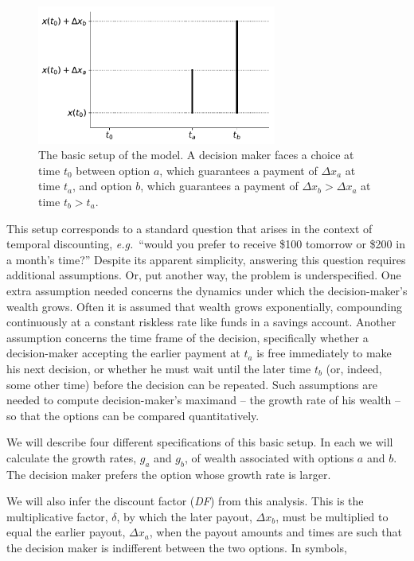 \documentclass[11pt]{article}
\newcommand{\eg}{{\it e.g.}\ }
\newcommand{\flabel}[1]{\label{fig:#1}}
\newcommand{\Dx}{\Delta x}
\numberwithin{equation}{section}
\begin{document}
\begin{figure}[!htb]
\centering
\includegraphics[width=0.7\textwidth]{./figures/setup.pdf}
\caption{
The basic setup of the model. A decision maker faces a choice at time $t_0$ between option $a$, which guarantees a payment of $\Dx_a$ at time $t_a$, and option $b$, which guarantees a payment of $\Dx_b>\Dx_a$ at time $t_b>t_a$.
}
\flabel{basicsetup}
\end{figure}

This setup corresponds to a standard question that arises in the context of temporal discounting, \eg ``would you prefer to receive \$100 tomorrow or \$200 in a month's time?'' Despite its apparent simplicity, answering this question requires additional assumptions. Or, put another way, the problem is underspecified. One extra assumption needed concerns the dynamics under which the decision-maker's wealth grows. Often it is assumed that wealth grows exponentially, compounding continuously at a constant riskless rate like funds in a savings account. Another assumption concerns the time frame of the decision, specifically whether a decision-maker accepting the earlier payment at $t_a$ is free immediately to make his next decision, or whether he must wait until the later time $t_b$ (or, indeed, some other time) before the decision can be repeated. Such assumptions are needed to compute decision-maker's maximand -- the growth rate of his wealth -- so that the options can be compared quantitatively.

We will describe four different specifications of this basic setup. In each we will calculate the growth rates, $g_a$ and $g_b$, of wealth associated with options $a$ and $b$. The decision maker prefers the option whose growth rate is larger.

We will also infer the discount factor (\textit{DF}) from this analysis. This is the multiplicative factor, $\delta$, by which the later payout, $\Dx_b$, must be multiplied to equal the earlier payout, $\Dx_a$, when the payout amounts and times are such that the decision maker is indifferent between the two options. In symbols,
\end{document}
